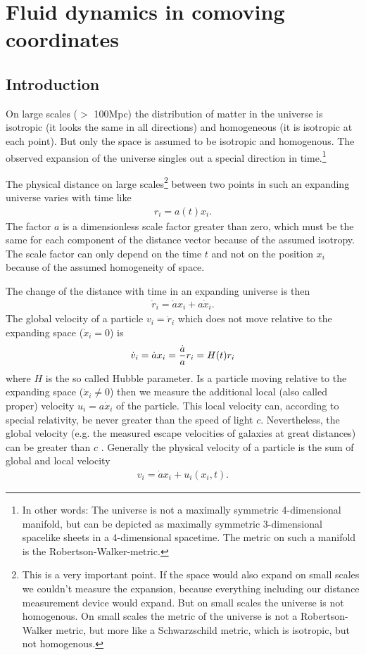 \chapter{Fluid dynamics in comoving coordinates}
\section{Introduction}
On large scales ($>$ 100Mpc) the distribution of matter 
in the universe is isotropic (it looks the same in all directions) 
and homogeneous (it is isotropic at each point). But only the space 
is assumed to be isotropic and homogenous. The observed expansion of 
the universe singles out a special direction in time.\footnote{In other
words: The universe is not a maximally symmetric 4-dimensional manifold, but can
be depicted as maximally symmetric 3-dimensional spacelike sheets 
in a 4-dimensional spacetime. The metric on such a manifold is the 
Robertson-Walker-metric.}

The physical distance on large scales\footnote{This is a very important 
point. If the space would also
expand on small scales we couldn't measure the expansion, because everything 
including our distance measurement device would expand. But on small scales
the universe is not homogenous. On small scales the metric of the universe is 
not a Robertson-Walker metric, but more like a Schwarzschild metric, which
is isotropic, but not homogenous.} 
between two points in such an expanding universe varies with time like
\begin{align}
r_i=a(t) x_i.
\end{align}
The factor $a$ is a dimensionless scale factor greater than zero, which must 
be the same for each component of the distance vector because of the assumed
isotropy.
The scale factor can only depend on the time $t$ and not on the position
$x_i$ because of the assumed homogeneity of space. 

The change of the distance with time in an expanding universe is then
\begin{align}
\dot{r}_i = \dot{a} x_i + a \dot{x}_i.  
\end{align}
The global velocity of a particle $v_i = \dot{r}_i$ which does not move 
relative to the expanding space ($\dot{x}_i = 0$) is
\begin{align}
\dot{v}_i = \dot{a} x_i = \frac{\dot{a}}{a} r_i = H(t) r_i 
\end{align}
where $H$ is the so called Hubble parameter. Is a particle moving relative to
the expanding space ($\dot{x}_i \neq 0$) then we measure the additional 
local (also called proper) velocity $u_i = a \dot{x}_i$ of the particle. This
local
velocity can, according to special relativity, be never greater than the speed
of light
$c$. Nevertheless, the global velocity (e.g. the measured escape velocities of
galaxies at 
great distances) can be greater than $c$ \citep{Davis2004}. Generally the
physical velocity 
of a particle is the sum of global and local velocity
\begin{align}
v_i = \dot{a} x_i + u_i (x_i,t).
\end{align}

